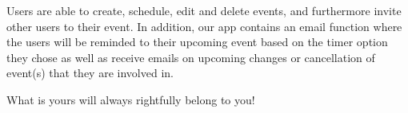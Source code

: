 Users are able to create, schedule, edit and delete events, and furthermore invite other users to their event. In addition, our app contains an email function where the users will be reminded to their upcoming event based on the timer option they chose as well as receive emails on upcoming changes or cancellation of event(s) that they are involved in. 


What is yours will always rightfully belong to you!